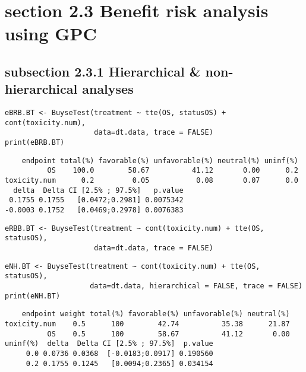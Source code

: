 \documentclass[12pt]{article}
\begin{document}
\section{section 2.3 Benefit risk analysis using GPC}
\label{sec:orgcfc100a}

\subsection{subsection 2.3.1 Hierarchical \& non-hierarchical analyses}
\label{sec:org9dc378e}
\lstset{language=r,label= ,caption= ,captionpos=b,numbers=none}
\begin{lstlisting}
eBRB.BT <- BuyseTest(treatment ~ tte(OS, statusOS) + cont(toxicity.num),
                     data=dt.data, trace = FALSE)
print(eBRB.BT)
\end{lstlisting}

\begin{verbatim}
    endpoint total(%) favorable(%) unfavorable(%) neutral(%) uninf(%)
          OS    100.0        58.67          41.12       0.00      0.2
toxicity.num      0.2         0.05           0.08       0.07      0.0
  delta  Delta CI [2.5% ; 97.5%]   p.value
 0.1755 0.1755   [0.0472;0.2981] 0.0075342
-0.0003 0.1752   [0.0469;0.2978] 0.0076383
\end{verbatim}


\lstset{language=r,label= ,caption= ,captionpos=b,numbers=none}
\begin{lstlisting}
eRBB.BT <- BuyseTest(treatment ~ cont(toxicity.num) + tte(OS, statusOS),
                     data=dt.data, trace = FALSE)
\end{lstlisting}

\lstset{language=r,label= ,caption= ,captionpos=b,numbers=none}
\begin{lstlisting}
eNH.BT <- BuyseTest(treatment ~ cont(toxicity.num) + tte(OS, statusOS),
                    data=dt.data, hierarchical = FALSE, trace = FALSE)
print(eNH.BT)
\end{lstlisting}

\begin{verbatim}
    endpoint weight total(%) favorable(%) unfavorable(%) neutral(%)
toxicity.num    0.5      100        42.74          35.38      21.87
          OS    0.5      100        58.67          41.12       0.00
uninf(%)  delta  Delta CI [2.5% ; 97.5%]  p.value
     0.0 0.0736 0.0368  [-0.0183;0.0917] 0.190560
     0.2 0.1755 0.1245   [0.0094;0.2365] 0.034154
\end{verbatim}
\end{document}
